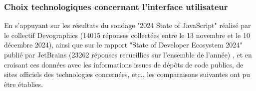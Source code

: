 \subsubsection{Choix technologiques concernant l'interface utilisateur} \label{sec:choix_client}

En s’appuyant sur les résultats du sondage "2024 State of JavaScript" réalisé par le collectif Devographics (14015 réponses collectées entre le 13 novembre et le 10 décembre 2024), ainsi que sur le rapport "State of Developer Ecosystem 2024" publié par JetBrains (23262 réponses recueillies sur l’ensemble de l’année) \autocites{noauthor_state_nodate}{noauthor_state_nodate-1}{noauthor_software_nodate}, et en croisant ces données avec les informations issues de dépôts de code publics, de sites officiels des technologies concernées, etc., les comparaisons suivantes ont pu être établies.

